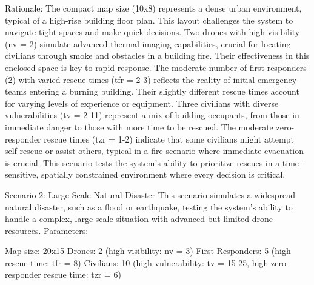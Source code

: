 Rationale:
The compact map size (10x8) represents a dense urban environment, typical of a high-rise building floor plan. This layout challenges the system to navigate tight spaces and make quick decisions.
Two drones with high visibility (nv = 2) simulate advanced thermal imaging capabilities, crucial for locating civilians through smoke and obstacles in a building fire. Their effectiveness in this enclosed space is key to rapid response.
The moderate number of first responders (2) with varied rescue times (tfr = 2-3) reflects the reality of initial emergency teams entering a burning building. Their slightly different rescue times account for varying levels of experience or equipment.
Three civilians with diverse vulnerabilities (tv = 2-11) represent a mix of building occupants, from those in immediate danger to those with more time to be rescued. The moderate zero-responder rescue times (tzr = 1-2) indicate that some civilians might attempt self-rescue or assist others, typical in a fire scenario where immediate evacuation is crucial.
This scenario tests the system's ability to prioritize rescues in a time-sensitive, spatially constrained environment where every decision is critical.

Scenario 2: Large-Scale Natural Disaster
This scenario simulates a widespread natural disaster, such as a flood or earthquake, testing the system's ability to handle a complex, large-scale situation with advanced but limited drone resources.
Parameters:

Map size: 20x15
Drones: 2 (high visibility: nv = 3)
First Responders: 5 (high rescue time: tfr = 8)
Civilians: 10 (high vulnerability: tv = 15-25, high zero-responder rescue time: tzr = 6)

